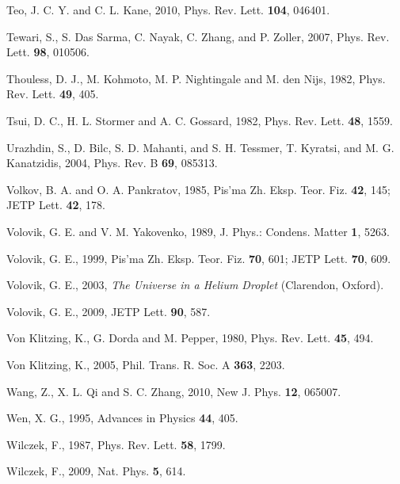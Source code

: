 \documentclass[twocolumn,floatfix,showpacs,rmp,aps]{revtex4}
\begin{document}
\begin{thebibliography}{99}
Teo, J. C. Y. and C. L. Kane, 2010,
Phys. Rev. Lett. {\bf 104}, 046401.

Tewari, S., S. Das Sarma, C. Nayak, C. Zhang, and P. Zoller, 2007,
Phys. Rev. Lett. {\bf 98}, 010506.

Thouless, D. J., M. Kohmoto, M. P. Nightingale and M. den Nijs, 1982,
Phys. Rev. Lett. {\bf 49}, 405.

Tsui, D. C., H. L. Stormer and A. C. Gossard, 1982,
Phys. Rev. Lett. {\bf 48}, 1559.

Urazhdin, S., D. Bilc, S. D. Mahanti, and S. H. Tessmer, T. Kyratsi, and M. G.
Kanatzidis, 2004,
Phys. Rev. B {\bf 69}, 085313.

Volkov, B. A. and O. A. Pankratov, 1985,
Pis'ma Zh. Eksp. Teor. Fiz. {\bf 42}, 145; JETP Lett. {\bf 42}, 178.

Volovik, G. E. and V. M. Yakovenko, 1989,
J. Phys.: Condens. Matter {\bf 1}, 5263.

Volovik, G. E., 1999,
Pis'ma Zh. Eksp. Teor. Fiz. {\bf 70}, 601; JETP Lett. {\bf 70}, 609.

Volovik, G. E., 2003,
{\it The Universe in a Helium Droplet} (Clarendon, Oxford).

Volovik, G. E., 2009,
JETP Lett. {\bf 90}, 587.

Von Klitzing, K., G. Dorda and M. Pepper, 1980,
Phys. Rev. Lett. {\bf 45}, 494.

Von Klitzing, K., 2005,
Phil. Trans. R. Soc. A {\bf 363}, 2203.

Wang, Z., X. L. Qi and S. C. Zhang, 2010,
New J. Phys. {\bf 12}, 065007.

Wen, X. G., 1995,
Advances in Physics {\bf 44}, 405.

Wilczek, F., 1987,
Phys. Rev. Lett. {\bf 58}, 1799.

Wilczek, F., 2009,
Nat. Phys. {\bf 5}, 614.


\end{thebibliography}
\end{document}
